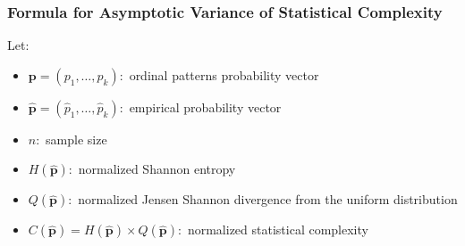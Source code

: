 \documentclass[12pt,a4paper]{article}
\begin{document}
\subsubsection{Formula for Asymptotic Variance of Statistical Complexity}
Let:
\begin{itemize}
	\item $\mathbf{p} = (p_1,\dots, p_k):$ ordinal patterns probability vector
	\item $\widehat{\mathbf{p}} = (\widehat{p}_1,\dots, \widehat{p}_k):$ empirical probability vector
	\item $n:$ sample size
	\item $H(\widehat{\mathbf{p}}):$ normalized Shannon entropy
	\item $Q(\widehat{\mathbf{p}}):$ normalized Jensen Shannon divergence from the uniform distribution
	\item $C(\widehat{\mathbf{p}})=H(\widehat{\mathbf{p}}) \times Q(\widehat{\mathbf{p}}):$ normalized statistical complexity
\end{itemize}
\end{document}
